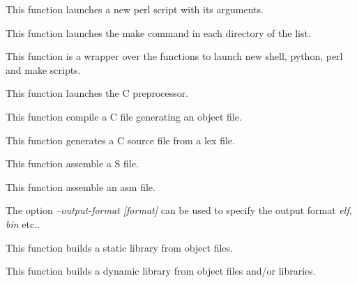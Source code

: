          {
	   This function launches a new perl script with its arguments.
	 }

         {
	   This function launches the make command in each directory of
	   the list.
	 }

         {
	   This function is a wrapper over the functions to launch new
	   shell, python, perl and make scripts.
	 }

         {
	   This function launches the C preprocessor.
	 }

         {
	   This function compile a C file generating an object file.
	 }

         {
	   This function generates a C source file from a lex file.
	 }

         {
	   This function assemble a S file.
	 }

         {
	   This function assemble an asm file.

	   The option \textit{--output-format [format]} can be used to
	   specify the output format \textit{elf}, \textit{bin} etc..
	 }

         {
	   This function builds a static library from object files.
	 }

         {
	   This function builds a dynamic library from object files and/or
	   libraries.
	 }

